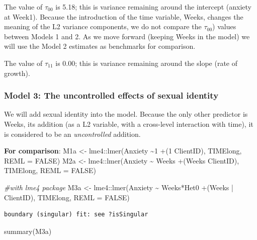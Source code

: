 \documentclass[
  11pt,
]{book}
\newenvironment{Shaded}{\begin{snugshade}}{\end{snugshade}}
\newcommand{\AttributeTok}[1]{\textcolor[rgb]{0.77,0.63,0.00}{#1}}
\newcommand{\CommentTok}[1]{\textcolor[rgb]{0.56,0.35,0.01}{\textit{#1}}}
\newcommand{\ConstantTok}[1]{\textcolor[rgb]{0.00,0.00,0.00}{#1}}
\newcommand{\FunctionTok}[1]{\textcolor[rgb]{0.00,0.00,0.00}{#1}}
\newcommand{\NormalTok}[1]{#1}
\newcommand{\OtherTok}[1]{\textcolor[rgb]{0.56,0.35,0.01}{#1}}
\newcommand{\SpecialCharTok}[1]{\textcolor[rgb]{0.00,0.00,0.00}{#1}}
\begin{document}
The value of \(\tau _{00}\) is 5.18; this is variance remaining around the intercept (anxiety at Week1). Because the introduction of the time variable, Weeks, changes the meaning of the L2 variance components, we do not compare the \(\tau _{00}\)) values between Models 1 and 2. As we move forward (keeping Weeks in the model) we will use the Model 2 estimates as benchmarks for comparison.

The value of \(\tau _{11}\) is 0.00; this is variance remaining around the slope (rate of growth).

\hypertarget{model-3-the-uncontrolled-effects-of-sexual-identity-1}{%
\subsubsection{Model 3: The uncontrolled effects of sexual identity}\label{model-3-the-uncontrolled-effects-of-sexual-identity-1}}

We will add sexual identity into the model. Because the only other predictor is Weeks, its addition (as a L2 variable, with a cross-level interaction with time), it is considered to be an \emph{uncontrolled} addition.

\textbf{For comparison}:
M1a \textless- lme4::lmer(Anxiety \textasciitilde1 +(1 \textbar{} ClientID), TIMElong, REML = FALSE)
M2a \textless- lme4::lmer(Anxiety \textasciitilde{} Weeks +(Weeks \textbar{} ClientID), TIMElong, REML = FALSE)

\begin{Shaded}
\begin{Highlighting}[]
\CommentTok{\#with lme4 package}
\NormalTok{M3a }\OtherTok{\textless{}{-}}\NormalTok{ lme4}\SpecialCharTok{::}\FunctionTok{lmer}\NormalTok{(Anxiety }\SpecialCharTok{\textasciitilde{}}\NormalTok{ Weeks}\SpecialCharTok{*}\NormalTok{Het0 }\SpecialCharTok{+}\NormalTok{(Weeks }\SpecialCharTok{|}\NormalTok{ ClientID), TIMElong, }\AttributeTok{REML =} \ConstantTok{FALSE}\NormalTok{)}
\end{Highlighting}
\end{Shaded}

\begin{verbatim}
boundary (singular) fit: see ?isSingular
\end{verbatim}

\begin{Shaded}
\begin{Highlighting}[]
\FunctionTok{summary}\NormalTok{(M3a)}
\end{Highlighting}
\end{Shaded}
\end{document}
